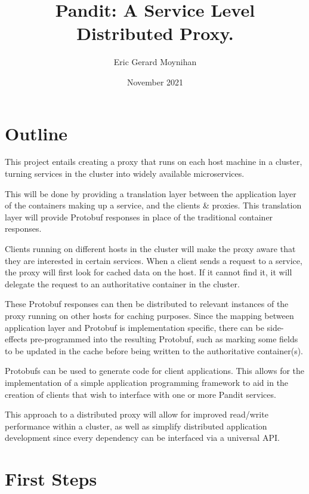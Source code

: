\documentclass[12pt]{article}
\title{Pandit: A Service Level Distributed Proxy.}
\author{Eric Gerard Moynihan}
\date{November 2021}
\begin{document}
\maketitle
\thispagestyle{empty}

\section*{Outline}
This project entails creating a proxy that runs on each host machine in a cluster, turning services in the cluster into widely available microservices. 

This will be done by providing a translation layer between the application layer of the containers making up a service, and the clients \& proxies.
This translation layer will provide Protobuf responses in place of the traditional container responses.

Clients running on different hosts in the cluster will make the proxy aware that they are interested in certain services.
When a client sends a request to a service, the proxy will first look for cached data on the host. 
If it cannot find it, it will delegate the request to an authoritative container in the cluster.

These Protobuf responses can then be distributed to relevant instances of the proxy running on other hosts for caching purposes.
Since the mapping between application layer and Protobuf is implementation specific, there can be side-effects pre-programmed into the resulting Protobuf, such as marking some fields to be updated in the cache before being written to the authoritative container(s).

Protobufs can be used to generate code for client applications. This allows for the implementation
of a simple application programming framework to aid in the creation of clients that wish to interface
with one or more Pandit services.

This approach to a distributed proxy will allow for improved read/write performance within a cluster, as well as simplify distributed application development since every dependency can be interfaced via a universal API.

\section*{First Steps}
\end{document}

